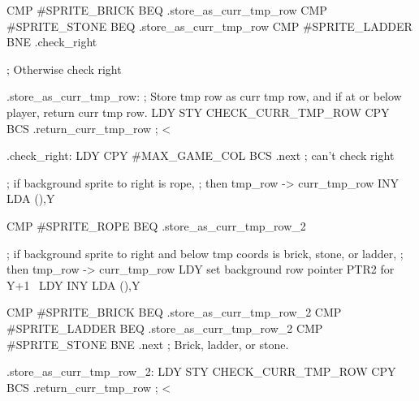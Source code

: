 \documentclass[10pt]{report}
\begin{document}
    CMP     #SPRITE_BRICK
    BEQ     .store_as_curr_tmp_row
    CMP     #SPRITE_STONE
    BEQ     .store_as_curr_tmp_row
    CMP     #SPRITE_LADDER
    BNE     .check_right

    ; Otherwise check right

.store_as_curr_tmp_row:
    ; Store tmp row as curr tmp row, and if at or below player, return curr tmp row.
    LDY     
    STY     CHECK_CURR_TMP_ROW
    CPY     
    BCS     .return_curr_tmp_row
    ;  < 

.check_right:
    LDY     
    CPY     #MAX_GAME_COL
    BCS     .next           ; can't check right

    ; if background sprite to right is rope,
    ; then tmp_row -> curr_tmp_row
    INY
    LDA     (),Y

    CMP     #SPRITE_ROPE
    BEQ     .store_as_curr_tmp_row_2

    ; if background sprite to right and below tmp coords is brick, stone, or ladder,
    ; then tmp_row -> curr_tmp_row
    LDY     
    \LA{}set background row pointer \code{}PTR2\edoc{} for \code{}Y+1\edoc{}~{\nwtagstyle{}}\RA{}
    LDY     
    INY
    LDA     (),Y

    CMP     #SPRITE_BRICK
    BEQ     .store_as_curr_tmp_row_2
    CMP     #SPRITE_LADDER
    BEQ     .store_as_curr_tmp_row_2
    CMP     #SPRITE_STONE
    BNE     .next
    ; Brick, ladder, or stone.

.store_as_curr_tmp_row_2:
    LDY     
    STY     CHECK_CURR_TMP_ROW
    CPY     
    BCS     .return_curr_tmp_row
    ;  < 
\end{document}
